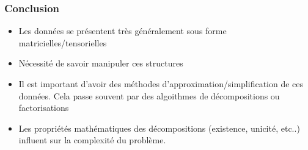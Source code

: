 \documentclass[9pt,table]{beamer} %
\begin{document}
\begin{frame}
\frametitle{Conclusion}

\begin{itemize}[label=\tiny$\blacksquare$]
	\item Les données se présentent très généralement sous forme matricielles/tensorielles
	\item Nécessité de savoir manipuler ces structures
	\item Il est important d'avoir des méthodes d'approximation/simplification de ces données. Cela passe souvent par des algoithmes de décompositions ou factorisations
	\item Les propriétés mathématiques des décompositions (existence, unicité, etc..) influent sur la complexité du problème.
\end{itemize}
\end{frame}





%
%
\end{document}

